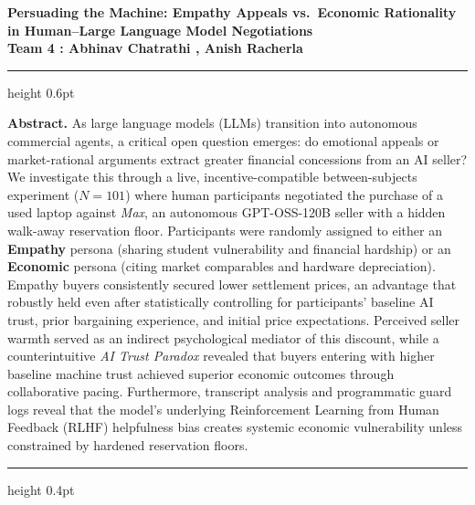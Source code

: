 \documentclass[10pt,a4paper]{article}
\begin{document}
\begin{center}
  {\large\bfseries Persuading the Machine: Empathy Appeals vs.\ Economic Rationality\\
  in Human--Large Language Model Negotiations}\\[4pt]
  {\small\bfseries Team 4 : Abhinav Chatrathi ,
  Anish Racherla }\quad
\end{center}

\vspace{1pt}
\hrule height 0.6pt
\vspace{4pt}

\begin{center}
  \begin{minipage}{0.96\textwidth}
    \small
    \setlength{\parskip}{4pt}
    \textbf{Abstract.}\;
    As large language models (LLMs) transition into autonomous commercial agents, a critical open question emerges: do emotional appeals or market-rational arguments extract greater financial concessions from an AI seller? We investigate this through a live, incentive-compatible between-subjects experiment ($N = 101$) where human participants negotiated the purchase of a used laptop against \emph{Max}, an autonomous GPT-OSS-120B seller with a hidden walk-away reservation floor. Participants were randomly assigned to either an \textbf{Empathy} persona (sharing student vulnerability and financial hardship) or an \textbf{Economic} persona (citing market comparables and hardware depreciation). Empathy buyers consistently secured lower settlement prices, an advantage that robustly held even after statistically controlling for participants' baseline AI trust, prior bargaining experience, and initial price expectations. Perceived seller warmth served as an indirect psychological mediator of this discount, while a counterintuitive \emph{AI Trust Paradox} revealed that buyers entering with higher baseline machine trust achieved superior economic outcomes through collaborative pacing. Furthermore, transcript analysis and programmatic guard logs reveal that the model's underlying Reinforcement Learning from Human Feedback (RLHF) helpfulness bias creates systemic economic vulnerability unless constrained by hardened reservation floors.
  \end{minipage}
\end{center}

\vspace{4pt}
\hrule height 0.4pt
\vspace{6pt}
\end{document}
